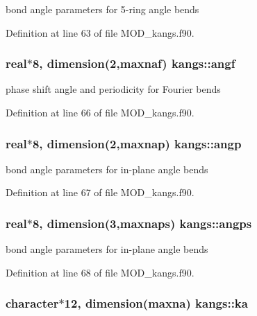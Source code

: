 bond angle parameters for 5-\/ring angle bends 



Definition at line 63 of file M\-O\-D\-\_\-kangs.\-f90.

\hypertarget{classkangs_a5b22b5bf50f74dcdacb6d24965ef5a33}{
\subsubsection[{angf}]{\setlength{\rightskip}{0pt plus 5cm}real$\ast$8, dimension(2,{\bf maxnaf}) kangs\-::angf}}\label{classkangs_a5b22b5bf50f74dcdacb6d24965ef5a33}


phase shift angle and periodicity for Fourier bends 



Definition at line 66 of file M\-O\-D\-\_\-kangs.\-f90.

\hypertarget{classkangs_a58286983ac9fbb4b1b314d852757211f}{
\subsubsection[{angp}]{\setlength{\rightskip}{0pt plus 5cm}real$\ast$8, dimension(2,{\bf maxnap}) kangs\-::angp}}\label{classkangs_a58286983ac9fbb4b1b314d852757211f}


bond angle parameters for in-\/plane angle bends 



Definition at line 67 of file M\-O\-D\-\_\-kangs.\-f90.

\hypertarget{classkangs_a9ff1f1899f2b1a3fed39948f73c9cb60}{
\subsubsection[{angps}]{\setlength{\rightskip}{0pt plus 5cm}real$\ast$8, dimension(3,{\bf maxnaps}) kangs\-::angps}}\label{classkangs_a9ff1f1899f2b1a3fed39948f73c9cb60}


bond angle parameters for in-\/plane angle bends 



Definition at line 68 of file M\-O\-D\-\_\-kangs.\-f90.

\hypertarget{classkangs_a804ce0bed5df2597765f5bdef9ec926c}{
\subsubsection[{ka}]{\setlength{\rightskip}{0pt plus 5cm}character$\ast$12, dimension({\bf maxna}) kangs\-::ka}}\label{classkangs_a804ce0bed5df2597765f5bdef9ec926c}


